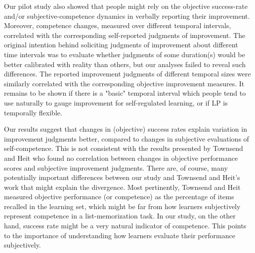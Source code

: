 Our pilot study also showed that people might rely on the objective success-rate and/or subjective-competence dynamics in verbally reporting their improvement. Moreover, competence changes, measured over different temporal intervals, correlated with the corresponding self-reported judgments of improvement. The original intention behind soliciting judgments of improvement about different time intervals was to evaluate whether judgments of some duration(s) would be better calibrated with reality than others, but our analyses failed to reveal such differences. The reported improvement judgments of different temporal sizes were similarly correlated with the corresponding objective improvement measures. It remains to be shown if there is a "basic" temporal interval which people tend to use naturally to gauge improvement for self-regulated learning, or if \ac{LP} is temporally flexible. 

Our results suggest that changes in (objective) success rates explain variation in improvement judgments better, compared to changes in subjective evaluations of self-competence. This is not consistent with the results presented by Townsend and Heit \parencite{townsend_judgments_2011,townsend_metacognitive_2011} who found no correlation between changes in objective performance scores and subjective improvement judgments. There are, of course, many potentially important differences between our study and Townsend and Heit's work that might explain the divergence. Most pertinently, Townsend and Heit measured objective performance (or competence) as the percentage of items recalled in the learning set, which might be far from how learners subjectively represent competence in a list-memorization task. In our study, on the other hand, success rate might be a very natural indicator of competence. This points to the importance of understanding how learners evaluate their performance subjectively.


